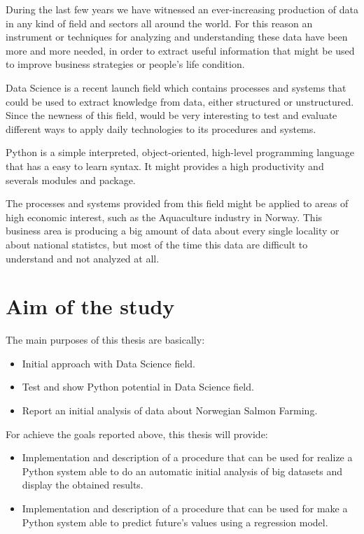 

During the last few years we have witnessed an ever-increasing production of data in any kind of field and sectors all around the world.
For this reason an instrument or techniques for analyzing and understanding these data have been more and more needed, in order to extract useful information that might be used to improve business strategies or people's life condition.

Data Science is a recent launch field which contains processes and systems that could be used to extract knowledge from data, either structured or unstructured. Since the newness of this field, would be very interesting to test and evaluate different ways to apply daily technologies to its procedures and systems.

Python is a simple interpreted, object-oriented, high-level programming language that has a easy to learn syntax. It might provides a high productivity and severals modules and package.

The processes and systems provided from this field might be applied to areas of high economic interest, such as the Aquaculture industry in Norway. This business area is producing a big amount of data about every single locality or about national statistcs, but most of the time this data are difficult to understand and not analyzed at all.

\newpage

\section{Aim of the study}

The main purposes of this thesis are basically:
\begin{itemize} 
 \item Initial approach with Data Science field.
 
 \item Test and show Python potential in Data Science field.
 
 \item Report an initial analysis of data about Norwegian Salmon Farming.

 \end{itemize}
For achieve the goals reported above, this thesis will provide:
\begin{itemize} 
 \item 	Implementation and description of a procedure that can be used for realize a Python system able to do an automatic initial analysis of big datasets and display the obtained results.
 \item Implementation and description of a procedure that can be used for make a Python system able to predict future’s values using a regression model. 
 \end{itemize}


